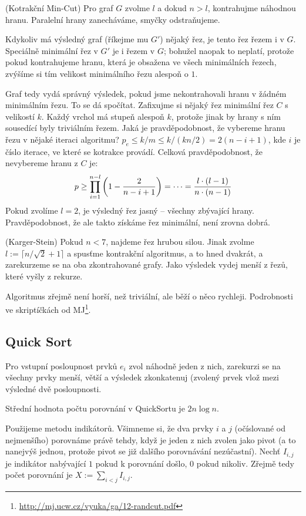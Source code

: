 \alg (Kotrakční Min-Cut) Pro graf $G$ zvolme $l$ a dokud $n > l$, kontrahujme
náhodnou hranu. Paralelní hrany zanecháváme, smyčky odstraňujeme.

Kdykoliv má výsledný graf (říkejme mu $G'$) nějaký řez, je tento řez řezem i v
$G$. Speciálně minimální řez v $G'$ je i řezem v $G$; bohužel naopak to neplatí,
protože pokud kontrahujeme hranu, která je obsažena ve všech minimálních řezech,
zvýšíme si tím velikost minimálního řezu alespoň o $1$. 

Graf tedy vydá správný výsledek, pokud jsme nekontrahovali hranu v žádném
minimálním řezu. To se dá spočítat. Zafixujme si nějaký řez minimální řez $C$ s
velikostí $k$. Každý vrchol má stupeň alespoň $k$, protože jinak by hrany s ním
sousedící byly triviálním řezem. Jaká je pravděpodobnost, že vybereme hranu
řezu v nějaké iteraci algoritmu? $p_e \leq k/m \leq k/(kn/2) = 2(n-i+1)$, kde
$i$ je číslo iterace, ve které se kotrakce provádí. Celková pravděpodobnost, že
nevybereme hranu z $C$ je:
\begin{align}
	p \geq \prod_{i=1}^{n-l} \left( 1 - {2 \over n-i+1}\right) = \dots = {l
	\cdot (l-1) \over n \cdot (n-1)}
\end{align}
Pokud zvolíme $l=2$, je výsledný řez jasný -- všechny zbývající hrany.
Pravděpodobnost, že ale takto získáme řez minimální, není zrovna dobrá.

\alg (Karger-Stein) Pokud $n < 7$, najdeme řez hrubou silou. Jinak zvolme $l :=
\lceil n/\sqrt 2 +1\rceil$ a spusťme kontrakční algoritmus, a to hned dvakrát, a
zarekurzeme se na oba zkontrahované grafy. Jako výsledek vydej menší z řezů,
které vyšly z rekurze.

Algoritmus zřejmě není horší, než triviální, ale běží o něco rychleji.
Podrobnosti ve skriptíčkách od
MJ\footnote{\url{http://mj.ucw.cz/vyuka/ga/12-randcut.pdf}}.

\subsection{Quick Sort}

\alg Pro vstupní posloupnost prvků $e_i$ zvol náhodně jeden z nich, zarekurzi se
na všechny prvky menší, větší a výsledek zkonkatenuj (zvolený prvek vlož mezi
výsledné dvě posloupnosti.

\vt Střední hodnota počtu porovnání v QuickSortu je $2n \log n$.

\dk Použijeme metodu indikátorů. Všimneme si, že dva prvky $i$ a $j$ (očíslované
od nejmenšího) porovnáme právě tehdy, když je jeden z nich zvolen jako pivot (a
to nanejvýš jednou, protože pivot se již dalšího porovnávání nezúčastní). Nechť
$I_{i,j}$ je indikátor nabývající $1$ pokud k porovnání došlo, $0$ pokud
nikoliv. Zřejmě tedy počet porovnání je $X := \sum_{i < j} I_{i,j}$.

